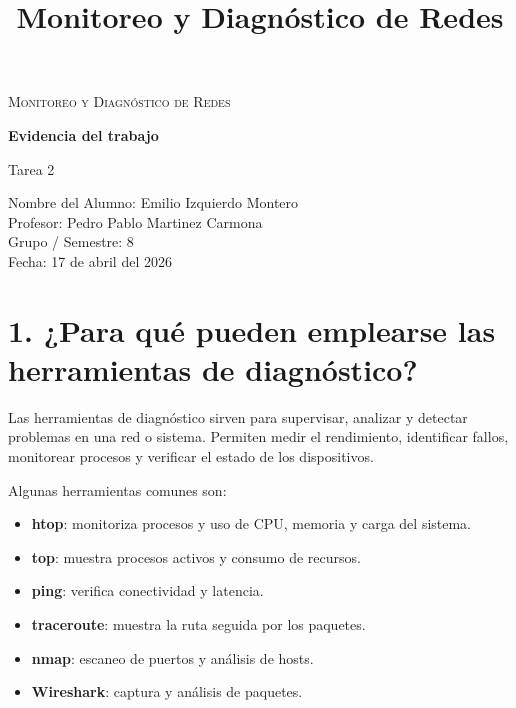 \documentclass[12pt]{article}
\title{Monitoreo y Diagnóstico de Redes}
\author{}
\date{}
\begin{document}
\begin{titlepage}
    \centering


    {\scshape\Large Monitoreo y Diagnóstico de Redes \par}
    \vspace{1.5cm}

    {\huge\bfseries Evidencia del trabajo \par}
    \vspace{0.5cm}
    {\Large Tarea 2 \par}

    \vfill

    {\large
    Nombre del Alumno: Emilio Izquierdo Montero {\hspace{6cm}} \\
    \vspace{0.3cm}
    Profesor: Pedro Pablo Martinez Carmona {\hspace{6cm}} \\
    \vspace{0.3cm}
    Grupo / Semestre: 8 {\hspace{6cm}} \\
    \vspace{0.3cm}
    Fecha: 17 de abril del 2026 {\hspace{6cm}}
    \par}

    \vfill

\end{titlepage}
\section*{1. ¿Para qué pueden emplearse las herramientas de diagnóstico?}

Las herramientas de diagnóstico sirven para supervisar, analizar y detectar problemas en una red o sistema. Permiten medir el rendimiento, identificar fallos, monitorear procesos y verificar el estado de los dispositivos.

Algunas herramientas comunes son:

\begin{itemize}
    \item \textbf{htop}: monitoriza procesos y uso de CPU, memoria y carga del sistema.
    \item \textbf{top}: muestra procesos activos y consumo de recursos.
    \item \textbf{ping}: verifica conectividad y latencia.
    \item \textbf{traceroute}: muestra la ruta seguida por los paquetes.
    \item \textbf{nmap}: escaneo de puertos y análisis de hosts.
    \item \textbf{Wireshark}: captura y análisis de paquetes.
\end{itemize}
\end{document}
